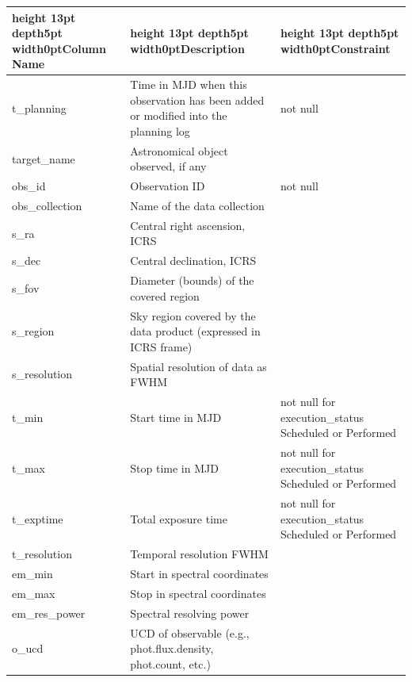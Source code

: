 \documentclass[11pt,a4paper]{ivoa}
\begin{document}
\begin{landscape}
\begin{table}
\def\hlstrut{\vrule height 13pt depth5pt width0pt}
\begin{tabular}{ |l|l|l| }
\hline
\hlstrut\textbf{Column Name} &
\hlstrut\textbf{Description} &
\hlstrut\textbf{Constraint} \\
\hline
t\_planning &
Time in MJD when this observation has been added or modified into the
planning log &
not null\\
\hline
target\_name &
Astronomical object observed, if any &
\\
\hline
obs\_id &
Observation ID &
not null\\
\hline
obs\_collection &
Name of the data collection &
\\
\hline
s\_ra &
Central right ascension, ICRS &
\\
\hline
s\_dec &
Central declination, ICRS &
\\
\hline
s\_fov  &
Diameter (bounds) of the covered region &
\\
\hline
s\_region &
Sky region covered by the data product (expressed in ICRS frame) &
\\
\hline
s\_resolution &
Spatial resolution of data as FWHM &
\\
\hline
t\_min &
Start time in MJD &
\makecell[l]{not null for execution\_status \\ Scheduled or Performed} \\
\hline
t\_max &
Stop time in MJD &
\makecell[l]{not null for execution\_status \\ Scheduled or Performed} \\
\hline
t\_exptime &
Total exposure time &
\makecell[l]{not null for execution\_status \\ Scheduled or Performed} \\
\hline
t\_resolution &
Temporal resolution FWHM &
\\
\hline
em\_min &
Start in spectral coordinates &
\\
\hline
em\_max &
Stop in spectral coordinates &
\\
\hline
em\_res\_power &
Spectral resolving power &
\\
\hline
o\_ucd &
UCD of observable (e.g., phot.flux.density, phot.count, etc.) &
\\

\end{tabular}
\end{table}
\end{landscape}
\end{document}
